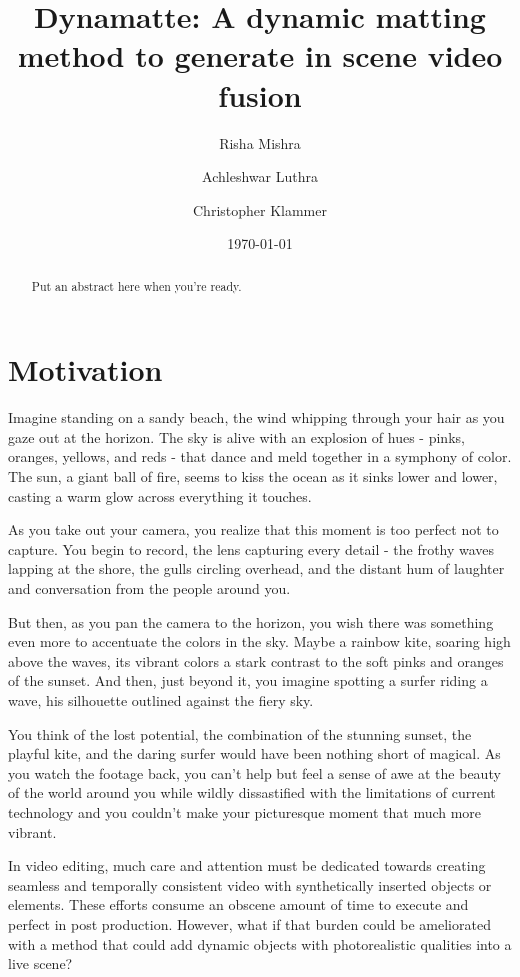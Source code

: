 \documentclass{amsart}
\title{Dynamatte: A dynamic matting method to generate in scene video fusion}
\author{Risha Mishra}
\author{Achleshwar Luthra}
\author{Christopher Klammer}
\date{\today}
\begin{document}
\begin{abstract}
 Put an abstract here when you're ready.
\end{abstract}

\maketitle

\tableofcontents

\section{Motivation}
Imagine standing on a sandy beach, the wind whipping through your hair as you gaze out at the horizon. The sky is alive with an explosion of hues - pinks, oranges, yellows, and reds - that dance and meld together in a symphony of color. The sun, a giant ball of fire, seems to kiss the ocean as it sinks lower and lower, casting a warm glow across everything it touches.

As you take out your camera, you realize that this moment is too perfect not to capture. You begin to record, the lens capturing every detail - the frothy waves lapping at the shore, the gulls circling overhead, and the distant hum of laughter and conversation from the people around you.

But then, as you pan the camera to the horizon, you wish there was something even more to accentuate the colors in the sky. Maybe a rainbow kite, soaring high above the waves, its vibrant colors a stark contrast to the soft pinks and oranges of the sunset. And then, just beyond it, you imagine spotting a surfer riding a wave, his silhouette outlined against the fiery sky.

You think of the lost potential, the combination of the stunning sunset, the playful kite, and the daring surfer would have been nothing short of magical. As you watch the footage back, you can't help but feel a sense of awe at the beauty of the world around you while wildly dissastified with the limitations of current technology and you couldn't make your picturesque moment that much more vibrant.


In video editing, much care and attention must be dedicated towards creating seamless and temporally consistent video with synthetically inserted objects or elements. These efforts consume an obscene amount of time to execute and perfect in post production. However, what if that burden could be ameliorated with a method that could add dynamic objects with photorealistic qualities into a live scene? 
\end{document}
